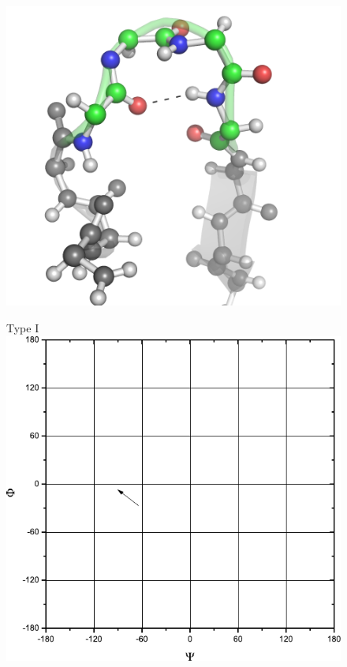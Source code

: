 \begin{figure}[p]

\begin{minipage}[b]{0.5\linewidth}
\centering
\includegraphics[width=1.0\textwidth]{./01-ProteinStructure/turns/beta-type-I.png}
\end{minipage}
\hspace{0.5cm}
\begin{minipage}[b]{0.3\linewidth}
\centering
Type I
\includegraphics[width=1.0\textwidth]{./01-ProteinStructure/turns/beta-ram-type-I.pdf}
\end{minipage}


\end{figure}
